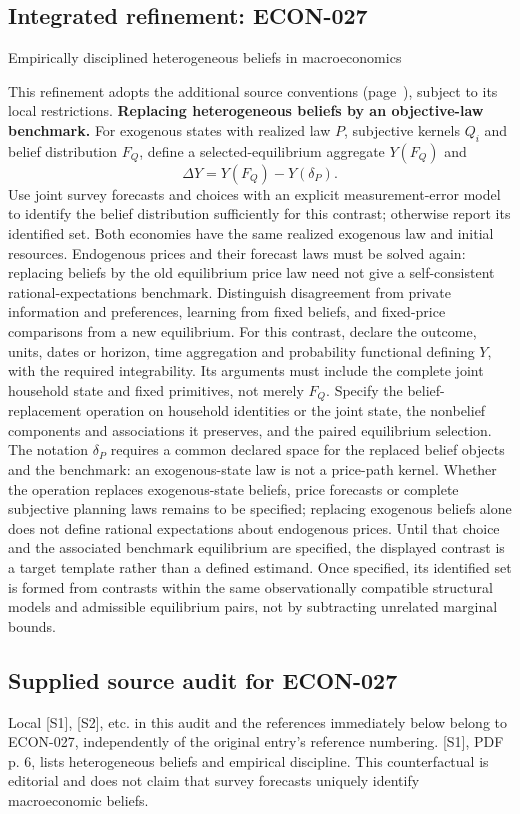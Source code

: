 \documentclass[11pt,a4paper]{article}
\begin{document}
\subsection*{Integrated refinement: ECON-027}
{\sffamily\small\color{muted}Empirically disciplined heterogeneous beliefs in macroeconomics\par}
This refinement adopts the additional source conventions
(page~\pageref{audited:conventions}), subject to its local restrictions.
\textbf{Replacing heterogeneous beliefs by an objective-law benchmark.}
For exogenous states with realized law $P$, subjective kernels $Q_i$ and belief
distribution $F_Q$, define a selected-equilibrium aggregate $Y(F_Q)$ and
\[
\Delta Y=Y(F_Q)-Y(\delta_P).
\]
Use joint survey forecasts and choices with an explicit measurement-error model
to identify the belief distribution sufficiently for this contrast; otherwise
report its identified set. Both economies have the same realized exogenous law
and initial resources. Endogenous prices and their forecast laws must be solved
again: replacing beliefs by the old equilibrium price law need not give a
self-consistent rational-expectations benchmark. Distinguish disagreement from
private information and preferences, learning from fixed beliefs, and
fixed-price comparisons from a new equilibrium.
For this contrast, declare the outcome, units, dates or horizon, time aggregation and probability functional defining \(Y\), with the required integrability. Its arguments must include the complete joint household state and fixed primitives, not merely \(F_Q\). Specify the belief-replacement operation on household identities or the joint state, the nonbelief components and associations it preserves, and the paired equilibrium selection. The notation \(\delta_P\) requires a common declared space for the replaced belief objects and the benchmark: an exogenous-state law is not a price-path kernel. Whether the operation replaces exogenous-state beliefs, price forecasts or complete subjective planning laws remains to be specified; replacing exogenous beliefs alone does not define rational expectations about endogenous prices. Until that choice and the associated benchmark equilibrium are specified, the displayed contrast is a target template rather than a defined estimand. Once specified, its identified set is formed from contrasts within the same observationally compatible structural models and admissible equilibrium pairs, not by subtracting unrelated marginal bounds.
\subsection*{Supplied source audit for ECON-027}
Local [S1], [S2], etc. in this audit and the references immediately below
belong to ECON-027, independently of the original entry's reference numbering.
[S1], PDF p. 6, lists heterogeneous beliefs and empirical discipline. This counterfactual is editorial and does not claim that survey forecasts uniquely identify macroeconomic beliefs.
\end{document}

